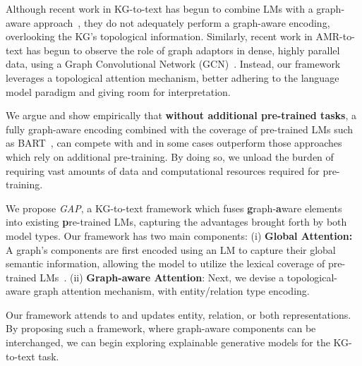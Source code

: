 \documentclass[11pt]{article}
\begin{document}
Although recent work in KG-to-text has begun to combine LMs with a graph-aware approach~\cite{ke-etal-2021-jointgt}, they do not adequately perform a graph-aware encoding, overlooking the KG's topological information. Similarly, recent work in AMR-to-text has begun to observe the role of graph adaptors in dense, highly parallel data, using a Graph Convolutional Network (GCN)~\cite{ribeiro-etal-2021-structural}. Instead, our framework leverages a topological attention mechanism, better adhering to the language model paradigm and giving room for interpretation.

We argue and show empirically that \textbf{without additional pre-trained tasks}, a fully graph-aware encoding combined with the coverage of pre-trained LMs such as BART~\cite{lewis2020bart}, can compete with and in some cases outperform those approaches which rely on additional pre-training. By doing so, we unload the burden of requiring vast amounts of data and computational resources required for pre-training.

We propose \textit{GAP}, a KG-to-text framework which fuses \textbf{g}raph-\textbf{a}ware elements into existing \textbf{p}re-trained LMs, capturing the advantages brought forth by both model types. 
Our framework has two main components: (i) \textbf{Global Attention:} A graph's components are first encoded using an LM to capture their global semantic information, allowing the model to utilize the lexical coverage of pre-trained LMs~\cite{davison2019commonsense,gururangan2020don,vulic2020probing}. (ii) \textbf{Graph-aware Attention}: Next, we devise a topological-aware graph attention mechanism, with entity/relation type encoding.

Our framework attends to and updates entity, relation, or both representations. 
By proposing such a framework, where graph-aware components can be interchanged, we can begin exploring explainable generative models for the KG-to-text task.
\end{document}
